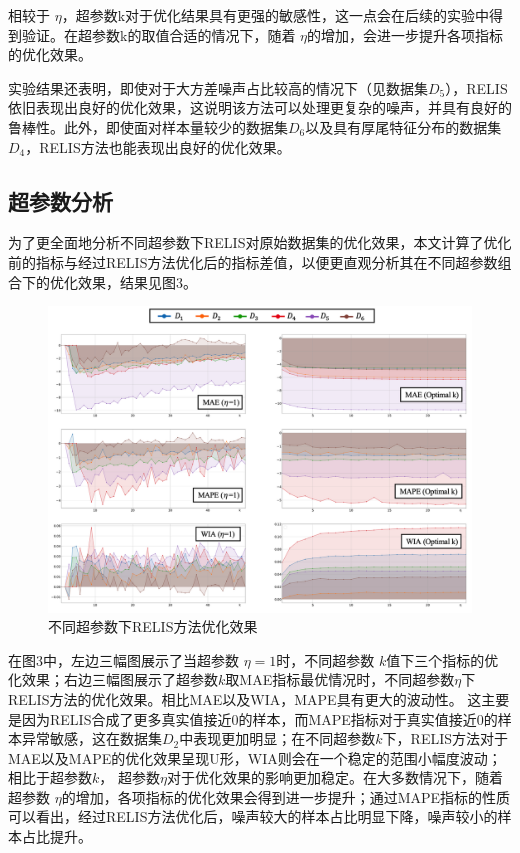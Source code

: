 \documentclass[12pt,a4paper]{article}%
\begin{document}
	相较于 $\eta$，超参数k对于优化结果具有更强的敏感性，这一点会在后续的实验中得到验证。在超参数k的取值合适的情况下，随着 $\eta$的增加，会进一步提升各项指标的优化效果。

	实验结果还表明，即使对于大方差噪声占比较高的情况下（见数据集$D_5$），RELIS依旧表现出良好的优化效果，这说明该方法可以处理更复杂的噪声，并具有良好的鲁棒性。此外，即使面对样本量较少的数据集$D_6$以及具有厚尾特征分布的数据集 $D_4$，RELIS方法也能表现出良好的优化效果。


	\subsection{超参数分析}

	为了更全面地分析不同超参数下RELIS对原始数据集的优化效果，本文计算了优化前的指标与经过RELIS方法优化后的指标差值，以便更直观分析其在不同超参数组合下的优化效果，结果见图3。

	\begin{figure}[t!]
		\centering
		\includegraphics[width=1.0\textwidth]{不同超参数下RELIS方法优化效果.png}
		\caption{不同超参数下RELIS方法优化效果}
		\label{fig5}
	\end{figure}
	在图3中，左边三幅图展示了当超参数 $\eta=1$时，不同超参数 $k$值下三个指标的优化效果；右边三幅图展示了超参数$k$取MAE指标最优情况时，不同超参数$\eta$下RELIS方法的优化效果。相比MAE以及WIA，MAPE具有更大的波动性。
	这主要是因为RELIS合成了更多真实值接近0的样本，而MAPE指标对于真实值接近0的样本异常敏感，这在数据集$D_2$中表现更加明显；在不同超参数$k$下，RELIS方法对于MAE以及MAPE的优化效果呈现U形，WIA则会在一个稳定的范围小幅度波动；相比于超参数$k$，
	超参数$\eta$对于优化效果的影响更加稳定。在大多数情况下，随着超参数 $\eta$的增加，各项指标的优化效果会得到进一步提升；通过MAPE指标的性质可以看出，经过RELIS方法优化后，噪声较大的样本占比明显下降，噪声较小的样本占比提升。
\end{document}
